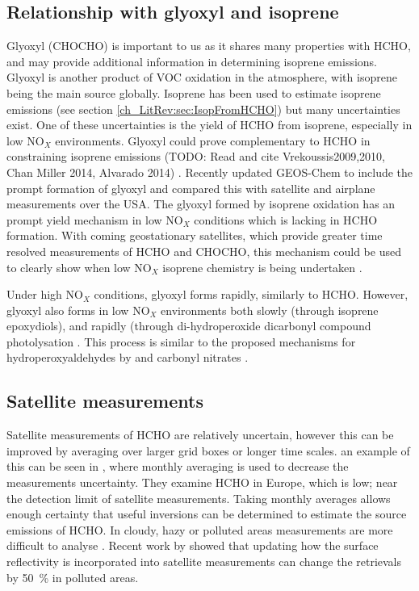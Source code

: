   \subsection{Relationship with glyoxyl and isoprene}
    Glyoxyl (CHOCHO) is important to us as it shares many properties with HCHO, and may provide additional information in determining isoprene emissions.
    Glyoxyl is another product of VOC oxidation in the atmosphere, with isoprene being the main source globally.
    Isoprene has been used to estimate isoprene emissions (see section \ref{ch_LitRev:sec:IsopFromHCHO}) but many uncertainties exist.
    One of these uncertainties is the yield of HCHO from isoprene, especially in low NO$_X$ environments.
    Glyoxyl could prove complementary to HCHO in constraining isoprene emissions (TODO: Read and cite Vrekoussis2009,2010, Chan Miller 2014, Alvarado 2014) \citep{Miller2017}.
    Recently \cite{Miller2017} updated GEOS-Chem to include the prompt formation of glyoxyl and compared this with satellite and airplane measurements over the USA.
    The glyoxyl formed by isoprene oxidation has an prompt yield mechanism in low NO$_X$ conditions which is lacking in HCHO formation.
    With coming geostationary satellites, which provide greater time resolved measurements of HCHO and CHOCHO, this mechanism could be used to clearly show when low NO$_X$ isoprene chemistry is being undertaken \citep{Miller2017}.
    
    Under high NO$_X$ conditions, glyoxyl forms rapidly, similarly to HCHO.
    However, glyoxyl also forms in low NO$_X$ environments both slowly (through isoprene epoxydiols), and rapidly (through di-hydroperoxide dicarbonyl compound photolysation \citep{Crounse2013}.
    This process is similar to the proposed mechanisms for hydroperoxyaldehydes by \citet{Peeters2014} and carbonyl nitrates \citep{Muller2014}.
    
  \subsection{Satellite measurements}
    Satellite measurements of HCHO are relatively uncertain, however this can be improved by averaging over larger grid boxes or longer time scales.
    an example of this can be seen in \citet{Dufour2009}, where monthly averaging is used to decrease the measurements uncertainty.
    They examine HCHO in Europe, which is low; near the detection limit of satellite measurements.
    Taking monthly averages allows enough certainty that useful inversions can be determined to estimate the source emissions of HCHO.
    In cloudy, hazy or polluted areas measurements are more difficult to analyse \citep[e.g.][]{Palmer2003,Marais2014}.
    Recent work by \cite{Vasilkov2017} showed that updating how the surface reflectivity is incorporated into satellite measurements can change the retrievals by 50~\% in polluted areas.
    
